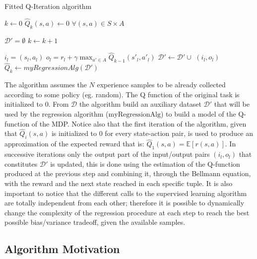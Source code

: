 		\begin{algorithm}[H]
				\caption{Fitted Q-Iteration algorithm}\label{fittedq}
				\begin{algorithmic}[1]
						\State $k \gets 0$
						\State $\hat{Q}_{k}(s,a) \gets 0$ $\forall (s,a) \in S \times A$

						\State $\mathcal{D}' = {\emptyset}$
							\State $k \gets k + 1$

								\State $i_l = (s_l, a_l)$
								\State $o_l = r_l + \gamma \max_{a' \in A} \hat{Q}_{k-1}(s'_l,a'_l)$
								\State $\mathcal{D}' \gets \mathcal{D}' \cup$ $(i_l,o_l)$
							\EndFor
							\State $\hat{Q}_{k} \gets myRegressionAlg(\mathcal{D}')$
						\EndWhile
					\EndProcedure
				\end{algorithmic}
		\end{algorithm}

	\noindent The algorithm assumes the $N$ experience samples to be already collected according to some policy (eg. random). The Q function
	of the original task is initialized to 0. From $\mathcal{D}$ the algorithm build an auxiliary dataset $\mathcal{D}'$ that will
	be used by the regression algorithm ($\text{myRegressionAlg}$) to build a model of the Q-function of the MDP.\newline
	Notice also that the first iteration of the algorithm, given that $\hat{Q}_i(s,a)$ is initialized to 0 for every state-action
	pair, is used to produce an approximation of the expected reward that is: $\hat{Q}_{1}(s,a) = \mathbb{E}[r(s,a)]$.
	In successive iterations only the output part of the input/output pairs $(i_l, o_l)$ that constitutes $\mathcal{D}'$ is updated,
	this is done using the estimation of the Q-function produced at the previous step and combining it, through the Bellmann equation,
	with the reward and the next state reached in each specific tuple.\newline
	It is also important to notice that the different calls to the supervised learning algorithm are totally independent
	from each other; therefore it is possible to dynamically change the complexity of the regression procedure at each step
	to reach the best possible bias/variance tradeoff, given the available samples.

	\subsection{Algorithm Motivation}

